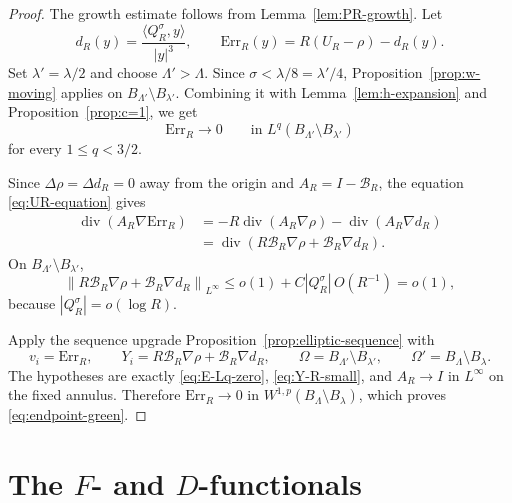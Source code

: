 \documentclass[11pt]{amsart}
\numberwithin{equation}{section}
\theoremstyle{definition}
\newcommand{\divE}{\operatorname{div}}
\newcommand{\rhoE}{\rho}
\newcommand{\ip}[2]{\langle #1,#2\rangle}
\newcommand{\norm}[1]{\left\lVert #1\right\rVert}
\newcommand{\abs}[1]{\left\lvert #1\right\rvert}
\begin{document}
\begin{proof}
The growth estimate follows from Lemma~\ref{lem:PR-growth}.  Let
$$
        d_R(y)=\frac{\ip{Q_R^\sigma}{y}}{\abs y^3},
        \qquad \mathrm{Err}_R(y)=R(U_R-\rhoE)-d_R(y).
$$
Set $\lambda'=\lambda/2$ and choose $\Lambda'>\Lambda$.  Since $\sigma<\lambda/8=\lambda'/4$, Proposition~\ref{prop:w-moving} applies on $B_{\Lambda'}\setminus B_{\lambda'}$.  Combining it with Lemma~\ref{lem:h-expansion} and Proposition~\ref{prop:c=1}, we get
\begin{equation}\label{eq:E-Lq-zero}
        \mathrm{Err}_R\to0\qquad\text{in }L^q(B_{\Lambda'}\setminus B_{\lambda'})
\end{equation}
for every $1\le q<3/2$.

Since $\Delta\rhoE=\Delta d_R=0$ away from the origin and $A_R=I-\mathcal B_R$, the equation \eqref{eq:UR-equation} gives
$$
\begin{aligned}
        \divE(A_R\nabla \mathrm{Err}_R)
        &=-R\divE(A_R\nabla\rhoE)-\divE(A_R\nabla d_R)      \\
        &=\divE\left(R\mathcal B_R\nabla\rhoE+\mathcal B_R\nabla d_R\right).
\end{aligned}
$$
On $B_{\Lambda'}\setminus B_{\lambda'}$,
\begin{equation}\label{eq:Y-R-small}
        \norm{R\mathcal B_R\nabla\rhoE+\mathcal B_R\nabla d_R}_{L^\infty}
        \le o(1)+C\abs{Q_R^\sigma}\,O(R^{-1})=o(1),
\end{equation}
because $\abs{Q_R^\sigma}=o(\log R)$.

Apply the sequence upgrade Proposition~\ref{prop:elliptic-sequence} with
$$
        v_i=\mathrm{Err}_R,
        \qquad
        Y_i=R\mathcal B_R\nabla\rhoE+\mathcal B_R\nabla d_R,
        \qquad
        \Omega=B_{\Lambda'}\setminus B_{\lambda'},
        \qquad
        \Omega'=B_\Lambda\setminus B_\lambda.
$$
The hypotheses are exactly \eqref{eq:E-Lq-zero}, \eqref{eq:Y-R-small}, and $A_R\to I$ in $L^\infty$ on the fixed annulus.  Therefore $\mathrm{Err}_R\to0$ in $W^{1,p}(B_\Lambda\setminus B_\lambda)$, which proves \eqref{eq:endpoint-green}.
\end{proof}

\section{\texorpdfstring{The $F$- and $D$-functionals}{The F- and D-functionals}}
\label{sec:D}
\end{document}
